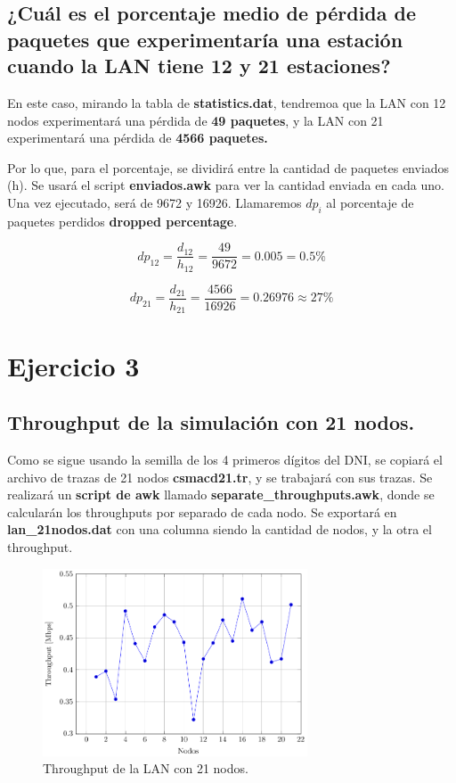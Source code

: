 \documentclass{article}
\begin{document}
\subsection{¿Cuál es el porcentaje medio de pérdida de paquetes que experimentaría una estación cuando la LAN tiene 12 y 21 estaciones?}

En este caso, mirando la tabla de \textbf{statistics.dat}, tendremoa que la LAN con 12 nodos experimentará una pérdida de \textbf{49 paquetes}, y la LAN con 21 experimentará una pérdida de \textbf{4566 paquetes.}

Por lo que, para el porcentaje, se dividirá entre la cantidad de paquetes enviados (h). Se usará el script \textbf{enviados.awk} para ver la cantidad enviada en cada uno. Una vez ejecutado, será de 9672 y 16926. Llamaremos \(dp_i\) al porcentaje de paquetes perdidos \textbf{dropped percentage}.

\[dp_{12} = \frac{d_{12}}{h_{12}} = \frac{49}{9672} = 0.005 = 0.5\% \]

\[dp_{21} = \frac{d_{21}}{h_{21}} = \frac{4566}{16926} = 0.26976 \approx 27\% \]

\section{Ejercicio 3}

\subsection{Throughput de la simulación con 21 nodos.}

Como se sigue usando la semilla de los 4 primeros dígitos del DNI, se copiará el archivo de trazas de 21 nodos \textbf{csmacd21.tr}, y se trabajará con sus trazas. Se realizará un \textbf{script de awk} llamado \textbf{separate\_throughputs.awk}, donde se calcularán los throughputs por separado de cada nodo. Se exportará en \textbf{lan\_21nodos.dat} con una columna siendo la cantidad de nodos, y la otra el throughput.

\begin{figure}[h]
	\centering
	\includegraphics[width=0.7\textwidth]{src/main.pdf}
	\caption{Throughput de la LAN con 21 nodos.}
\end{figure}
\end{document}
